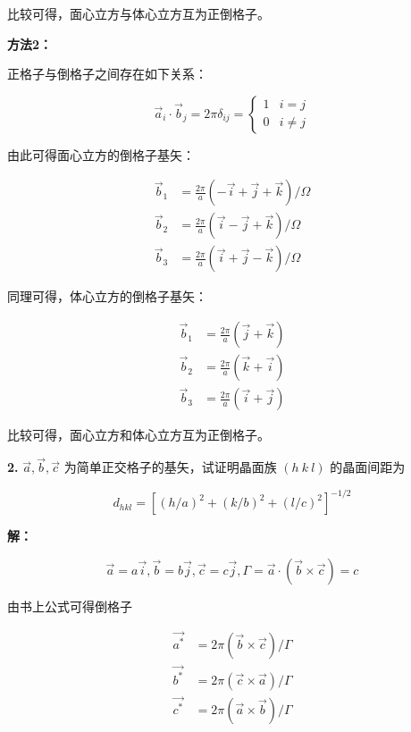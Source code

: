 比较可得，面心立方与体心立方互为正倒格子。

\noindent \textbf{方法2：}

正格子与倒格子之间存在如下关系：

\begin{equation*}
    \vec{a}_i \cdot \vec{b}_j = 2 \pi \delta_{ij} =
    \begin{cases}
        1 & i = j \\
        0 & i\ne j
    \end{cases}
\end{equation*}

由此可得面心立方的倒格子基矢：

\begin{align*}
    \vec{b}_1 &= \frac{2\pi}{a} (-\vec{i}+\vec{j}+\vec{k}) / \Omega \\
    \vec{b}_2 &= \frac{2\pi}{a} (\vec{i}-\vec{j}+\vec{k}) / \Omega \\
    \vec{b}_3 &= \frac{2\pi}{a} (\vec{i}+\vec{j}-\vec{k}) / \Omega
\end{align*}

同理可得，体心立方的倒格子基矢：

\begin{align*}
    \vec{b}_1 &= \frac{2\pi}{a} (\vec{j}+\vec{k}) \\
    \vec{b}_2 &= \frac{2\pi}{a} (\vec{k}+\vec{i}) \\
    \vec{b}_3 &= \frac{2\pi}{a} (\vec{i}+\vec{j})
\end{align*}

比较可得，面心立方和体心立方互为正倒格子。

\noindent \textbf{2.\quad} $\vec{a}, \vec{b}, \vec{c}$ 为简单正交格子的基矢，试证明晶面族 $(h\ k\ l)$ 的晶面间距为

\begin{equation*}
    d_{hkl} = \left[(h/a)^2 + (k/b)^2 + (l/c)^2\right]^{-1/2}
\end{equation*}

\noindent \textbf{解：}

\begin{equation*}
    \vec{a} = a \vec{i}, \vec{b} = b \vec{j}, \vec{c} = c \vec{j}, \Gamma  = \vec{a} \cdot (\vec{b} \times \vec{c}) = c
\end{equation*}

由书上公式可得倒格子

\begin{align*}
    \vec{a^*} &= 2\pi (\vec{b} \times \vec{c}) / \Gamma \\
    \vec{b^*} &= 2\pi (\vec{c} \times \vec{a}) / \Gamma \\
    \vec{c^*} &= 2\pi (\vec{a} \times \vec{b}) / \Gamma
\end{align*}

